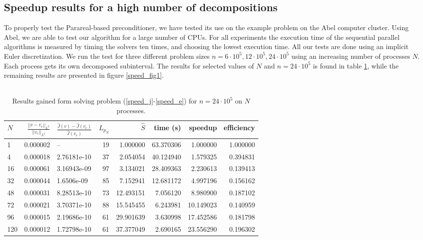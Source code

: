 \subsection{Speedup results for a high number of decompositions}
To properly test the Parareal-based preconditioner, we have tested its use on the example problem on the Abel computer cluster. Using Abel, we are able to test our algorithm for a large number of CPUs. For all experiments the execution time of the sequential parallel algorithms is measured by timing the solvers ten times, and choosing the lowest execution time. All our tests are done using an implicit Euler discretization. We run the test for three different problem sizes $n=6\cdot 10^5,12\cdot 10^5,24\cdot 10^5$ using an increasing number of processes $N$. Each process gets its own decomposed subinterval. The results for selected values of $N$ and $n= 24\cdot 10^5$ is found in table \ref{speed1}, while the remaining results are presented in figure \ref{speed_fig1}.
\\
\\
\begin{table}[h]
\centering
\caption{Results gained form solving problem (\ref{speed_j}-\ref{speed_e}) for $n=24\cdot 10^5$ on $N$ processes.}
\label{speed1}
\begin{tabular}{lrlrrrrr}
\toprule
{}$N$ &   $\frac{||v-v_e||_{L^2}}{||v_e||_{L^2}}$ &     $\frac{\hat J(v)-\hat J(v_e)}{\hat{J}(v_e)}$ &   $L_{p_N}$ &     $\hat S$ &       time (s) &    speedup &        efficiency \\
\midrule
1   &  0.000002 &           -- &  19 &   1.000000 &  63.370306 &   1.000000 &  1.000000 \\
4   &  0.000018 &  2.76181e-10 &  37 &   2.054054 &  40.124940 &   1.579325 &  0.394831 \\
16  &  0.000061 &  3.16943e-09 &  97 &   3.134021 &  28.409363 &   2.230613 &  0.139413 \\
32  &  0.000044 &   1.6506e-09 &  85 &   7.152941 &  12.681172 &   4.997196 &  0.156162 \\
48  &  0.000031 &  8.28513e-10 &  73 &  12.493151 &   7.056120 &   8.980900 &  0.187102 \\
72  &  0.000021 &  3.70371e-10 &  88 &  15.545455 &   6.243981 &  10.149023 &  0.140959 \\
96  &  0.000015 &  2.19686e-10 &  61 &  29.901639 &   3.630998 &  17.452586 &  0.181798 \\
120 &  0.000012 &  1.72798e-10 &  61 &  37.377049 &   2.690165 &  23.556290 &  0.196302 \\
\bottomrule
\end{tabular}
\end{table}
